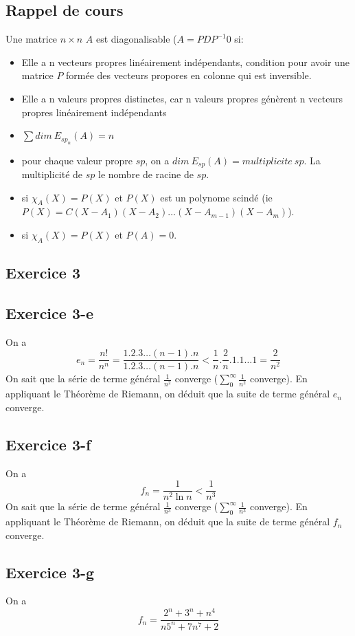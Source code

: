 \documentclass[]{book}
\theoremstyle{definition}
\begin{document}
\subsection*{Rappel de cours}
Une matrice $n \times n$ $A$ est diagonalisable ($A = PDP^{-1}$0 si:
\begin{itemize}
\item Elle a n vecteurs propres lin\'eairement ind\'ependants, condition pour avoir une matrice $P$ form\'ee des vecteurs propores en colonne qui est inversible. 
\item Elle a n valeurs propres distinctes, car n valeurs propres g\'en\`erent n vecteurs propres lin\'eairement ind\'ependants
\item $\sum{dim\ E_{sp_n}(A)} = n$
\item pour chaque valeur propre $sp$, on a $dim\ E_{sp}(A) = multiplicite\ sp$. La multiplicit\'e de $sp$ le nombre de racine de $sp$.
\item si $\chi_{A}(X) = P(X)$ et $P(X)$ est un polynome scind\'e (ie $P(X) = C(X-A_1)(X-A_2)\ldots(X-A_{m-1})(X-A_m)$).
\item si $\chi_{A}(X) = P(X)$ et $P(A)=0$.
\end{itemize}


\newpage
\subsection*{Exercice 3}
\subsection*{Exercice 3-e}
On a 
$$e_n = \frac{n!}{n^n} = \frac{1.2.3 \ldots (n-1).n}{1.2.3 \ldots (n-1).n} < \frac{1}{n}.\frac{2}{n}.1.1\ldots 1 = \frac{2}{n^2}$$
On sait que la s\'erie de terme g\'en\'eral $\frac{1}{n^2}$ converge ($\sum_{0}^{\infty}{\frac{1}{n^2}}$ converge). En appliquant le Th\'eor\`eme de Riemann, on d\'eduit que la suite de terme g\'en\'eral $e_n$ converge.

\subsection*{Exercice 3-f}
On a 
$$f_n = \frac{1}{n^2 \ln n} < \frac{1}{n^3}$$
On sait que la s\'erie de terme g\'en\'eral $\frac{1}{n^3}$ converge ($\sum_{0}^{\infty}{\frac{1}{n^3}}$ converge). En appliquant le Th\'eor\`eme de Riemann, on d\'eduit que la suite de terme g\'en\'eral $f_n$ converge.

\subsection*{Exercice 3-g}
On a 
$$f_n = \frac{2^n+3^n+n^4}{n5^n+7n^7+2}$$
\end{document}

